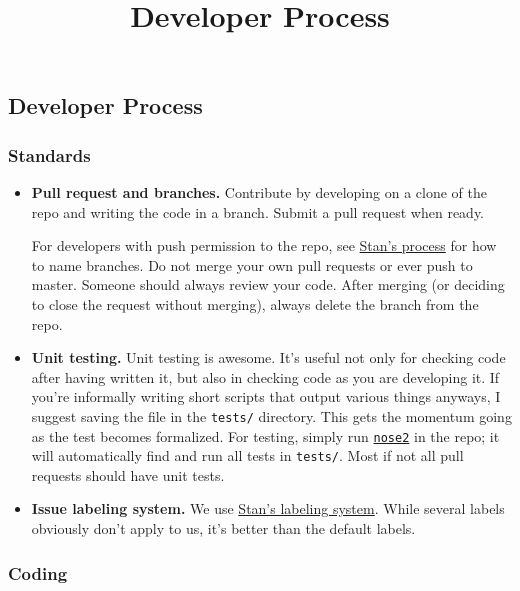 \title{Developer Process}

\subsection{Developer Process}

\subsubsection{Standards}

\begin{itemize}
\item
  \textbf{Pull request and branches.}
  Contribute by developing on a clone of the repo and writing the code
  in a branch. Submit a pull request when ready.

  For developers with push permission to the repo, see
  \href{https://github.com/stan-dev/stan/wiki/Developer-Process#information-to-include-in-pull-request}{Stan's
  process} for how to name branches.  Do not merge your own pull
  requests or ever push to master. Someone should always review your
  code.  After merging (or deciding to close the request without
  merging), always delete the branch from the repo.
\item
  \textbf{Unit testing.} Unit testing is awesome. It's useful not only
  for checking code after having written it, but also in checking code
  as you are developing it. If you're informally writing short scripts
  that output various things anyways, I suggest saving the file in the
  \texttt{tests/} directory. This gets the momentum going as the test
  becomes formalized. For testing, simply run
  \href{http://nose2.readthedocs.io/en/latest/getting_started.html}{\texttt{nose2}}
  in the repo; it will automatically find and run all tests in
  \texttt{tests/}. Most if not all pull requests should have unit tests.
\item
  \textbf{Issue labeling system.} We use
  \href{https://github.com/stan-dev/stan/issues}{Stan's labeling system}.
  While several labels obviously don't apply to us, it's better than the
  default labels.
\end{itemize}

\subsubsection{Coding}

